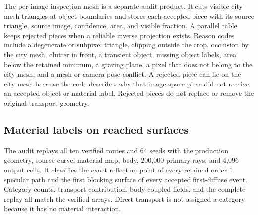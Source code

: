 The per-image inspection mesh is a separate audit product. It cuts visible
city-mesh triangles at object boundaries and stores each accepted piece with
its source triangle, source image, confidence, area, and visible fraction. A
parallel table keeps rejected pieces when a reliable
inverse projection exists. Reason codes include a degenerate or subpixel
triangle, clipping outside the crop, occlusion by the city mesh, clutter in
front, a transient object, missing object labels, area below the retained
minimum, a grazing plane, a pixel that does not belong to the city mesh, and
a mesh or camera-pose conflict. A rejected piece can lie on the city mesh
because the code describes why that image-space piece did not receive an
accepted object or material label. Rejected pieces do not replace or remove the original
transport geometry.

\subsection{Material labels on reached surfaces}
\label{sec:si-ray-reached-coverage}

The audit replays all ten verified routes and 64 seeds with the production
geometry, source curve, material map, body, 200,000 primary rays, and 4,096 output
cells. It classifies the exact reflection point of every retained order-1
specular path and the first blocking surface of every accepted
first-diffuse event. Category counts, transport contribution, body-coupled
fields, and the complete replay all match the verified arrays. Direct
transport is not assigned a category because it has no material interaction.

\begin{table}[!t]
  \caption{Share of pooled body-coupled whole-body SAR within each retained non-direct component. Other fallback combines insufficient structural probability, a rejected image label, and the remaining geometry-based category.}
  \label{tab:si-ray-reached-coverage}
  \centering
\end{table}

